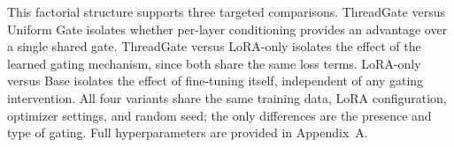 This factorial structure supports three targeted comparisons. ThreadGate versus Uniform Gate isolates whether per-layer conditioning provides an advantage over a single shared gate. ThreadGate versus LoRA-only isolates the effect of the learned gating mechanism, since both share the same loss terms. LoRA-only versus Base isolates the effect of fine-tuning itself, independent of any gating intervention. All four variants share the same training data, LoRA configuration, optimizer settings, and random seed; the only differences are the presence and type of gating. Full hyperparameters are provided in Appendix~A.